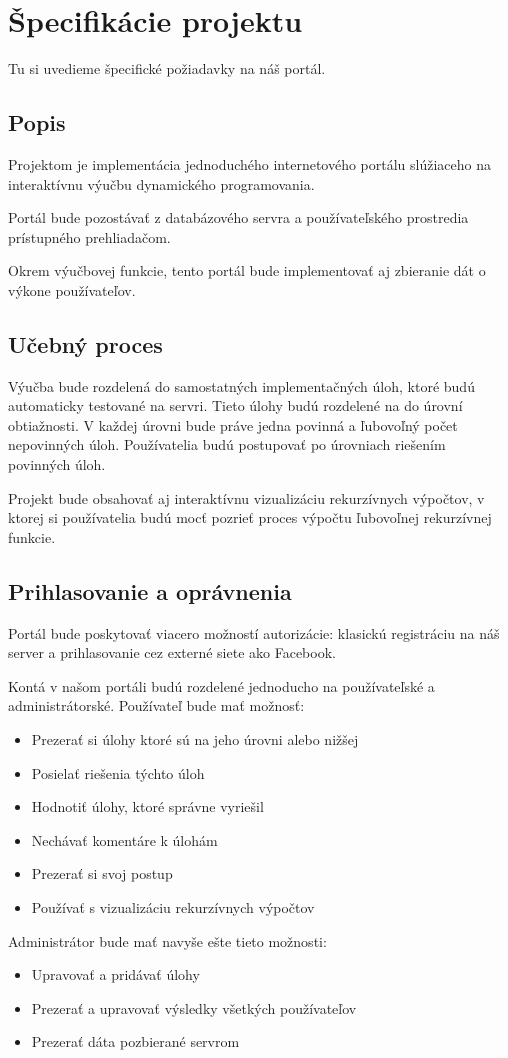 \chapter{Špecifikácie projektu}
Tu si uvedieme špecifické požiadavky na náš portál.

\section{Popis}
Projektom je implementácia jednoduchého internetového portálu slúžiaceho na interaktívnu výučbu
dynamického programovania.

Portál bude pozostávať z databázového servra a používateľského prostredia
prístupného prehliadačom.

Okrem výučbovej funkcie, tento portál bude implementovať aj zbieranie dát
o výkone používateľov.
\section{Učebný proces}
Výučba bude rozdelená do samostatných implementačných úloh, ktoré budú automaticky
testované na servri. Tieto úlohy budú rozdelené na do úrovní obtiažnosti.
V každej úrovni bude práve jedna povinná a ľubovoľný počet nepovinných úloh.
Používatelia budú postupovať po úrovniach riešením povinných úloh.

Projekt bude obsahovať aj interaktívnu vizualizáciu rekurzívnych výpočtov,
v ktorej si používatelia budú mocť pozrieť proces výpočtu ľubovoľnej rekurzívnej funkcie.

\section{Prihlasovanie a oprávnenia}
Portál bude poskytovať viacero možností autorizácie: klasickú registráciu
na náš server a prihlasovanie cez externé siete ako Facebook.

Kontá v našom portáli budú rozdelené jednoducho na používateľské a administrátorské.
\newpage
Používateľ bude mať možnosť:
\begin{itemize}
  \item Prezerať si úlohy ktoré sú na jeho úrovni alebo nižšej
  \item Posielať riešenia týchto úloh
  \item Hodnotiť úlohy, ktoré správne vyriešil
  \item Nechávať komentáre k úlohám
  \item Prezerať si svoj postup
  \item Používať s vizualizáciu rekurzívnych výpočtov
\end{itemize}
Administrátor bude mať navyše ešte tieto možnosti:
\begin{itemize}
  \item Upravovať a pridávať úlohy
  \item Prezerať a upravovať výsledky všetkých používateľov
  \item Prezerať dáta pozbierané servrom
\end{itemize}
